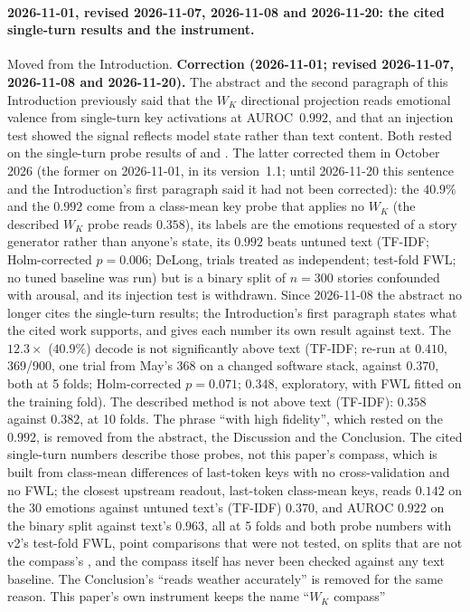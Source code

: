 \documentclass[11pt,a4paper]{article}
\begin{document}
\paragraph{2026-11-01, revised 2026-11-07, 2026-11-08 and 2026-11-20: the cited
single-turn results and the instrument.} Moved from the Introduction.
\textbf{Correction (2026-11-01; revised 2026-11-07, 2026-11-08 and 2026-11-20).}
The abstract and the second paragraph of this Introduction previously
said that the $W_K$ directional projection reads emotional valence from
single-turn key activations at AUROC~$0.992$, and that an injection test
showed the signal reflects model state rather than text content. Both
rested on the single-turn probe results of
\citet{lyra2026techniqueii} and \citet{lyra2026usermodel}. The latter
corrected them in October 2026 (the former on 2026-11-01, in its version~1.1; until 2026-11-20 this sentence and the Introduction's first paragraph said it had not been corrected): the $40.9\%$ and the $0.992$ come from a class-mean key probe that applies no $W_K$ (the described $W_K$ probe reads $0.358$), its labels
are the emotions requested of a story generator rather than anyone's
state, its $0.992$ beats untuned text (TF-IDF; Holm-corrected $p = 0.006$; DeLong, trials treated as independent; test-fold FWL; no tuned baseline was run) but is a binary split of $n = 300$ stories
confounded with arousal, and its injection test is withdrawn. Since
2026-11-08 the abstract no longer cites the single-turn results; the
Introduction's first paragraph states what the cited work supports, and
gives each number its own result against text. The $12.3\times$ ($40.9\%$) decode is not
significantly above text (TF-IDF; re-run at $0.410$, 369/900, one trial from May's 368 on a changed software stack, against $0.370$, both at 5 folds; Holm-corrected $p = 0.071$; $0.348$, exploratory, with FWL fitted on the training fold). The described method
is not above text (TF-IDF): $0.358$ against $0.382$, at 10 folds. The phrase ``with high fidelity'', which rested on
the $0.992$, is removed from the abstract, the Discussion and the
Conclusion. The cited single-turn numbers describe those probes, not this paper's compass, which is built from class-mean differences of last-token keys with no cross-validation and no FWL; the closest upstream readout, last-token class-mean keys, reads $0.142$ on the 30 emotions against untuned text's (TF-IDF) $0.370$, and AUROC $0.922$ on the binary split against text's $0.963$, all at 5 folds and both probe numbers with v2's test-fold FWL, point comparisons that were not tested, on splits that are not the compass's \citep{lyra2026usermodel}, and the compass itself has never been checked against any text baseline. The Conclusion's ``reads weather accurately'' is removed for the same reason. This paper's own instrument keeps the name ``$W_K$ compass''
\end{document}
